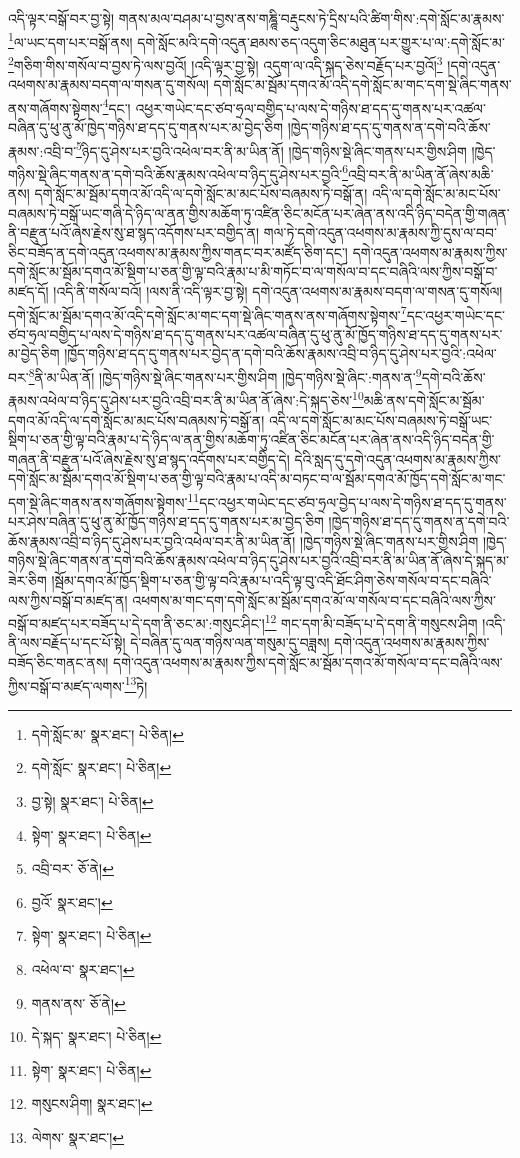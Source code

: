 འདི་ལྟར་བསྒོ་བར་བྱ་སྟེ། གནས་མལ་བཤམ་པ་བྱས་ནས་གཎྜཱི་བརྡུངས་ཏེ་དྲིས་པའི་ཚིག་གིས་:དགེ་སློང་མ་རྣམས་\footnote{དགེ་སློང་མ་  སྣར་ཐང་།  པེ་ཅིན། }ལ་ཡང་དག་པར་བསྒོ་ནས། དགེ་སློང་མའི་དགེ་འདུན་ཐམས་ཅད་འདུག་ཅིང་མཐུན་པར་གྱུར་པ་ལ་:དགེ་སློང་མ་\footnote{དགེ་སློང་  སྣར་ཐང་།  པེ་ཅིན། }གཅིག་གིས་གསོལ་བ་བྱས་ཏེ་ལས་བྱའོ། །འདི་ལྟར་བྱ་སྟེ། འདུག་ལ་འདི་སྐད་ཅེས་བརྗོད་པར་བྱའོ།\footnote{བྱ་སྟེ།  སྣར་ཐང་།  པེ་ཅིན། } །དགེ་འདུན་འཕགས་མ་རྣམས་བདག་ལ་གསན་དུ་གསོལ། དགེ་སློང་མ་སྦོམ་དགའ་མོ་འདི་དགེ་སློང་མ་གང་དག་སྡེ་ཞིང་གནས་ནས་གཞོགས་སྟེགས་\footnote{སྟེག་  སྣར་ཐང་།  པེ་ཅིན། }དང་། འཕྱར་གཡེང་དང་ཙབ་ཧྲལ་བགྱིད་པ་ལས་དེ་གཉིས་ཐ་དད་དུ་གནས་པར་འཚལ་བཞིན་དུ་ཕུ་ནུ་མོ་ཁྱེད་གཉིས་ཐ་དད་དུ་གནས་པར་མ་བྱེད་ཅིག །ཁྱེད་གཉིས་ཐ་དད་དུ་གནས་ན་དགེ་བའི་ཆོས་རྣམས་:འབྲི་བ་\footnote{འབྲི་བར་  ཅོ་ནེ། }ཉིད་དུ་ཤེས་པར་བྱའི་འཕེལ་བར་ནི་མ་ཡིན་ནོ། །ཁྱེད་གཉིས་སྡེ་ཞིང་གནས་པར་གྱིས་ཤིག །ཁྱེད་གཉིས་སྡེ་ཞིང་གནས་ན་དགེ་བའི་ཆོས་རྣམས་འཕེལ་བ་ཉིད་དུ་ཤེས་པར་བྱའི་\footnote{བྱའོ་  སྣར་ཐང་། }འབྲི་བར་ནི་མ་ཡིན་ནོ་ཞེས་མཆི་ནས། དགེ་སློང་མ་སྦོམ་དགའ་མོ་འདི་ལ་དགེ་སློང་མ་མང་པོས་བཞམས་ཏེ་བསྒོ་ན། འདི་ལ་དགེ་སློང་མ་མང་པོས་བཞམས་ཏེ་བསྒོ་ཡང་གཞི་དེ་ཉིད་ལ་ནན་གྱིས་མཆོག་ཏུ་འཛིན་ཅིང་མངོན་པར་ཞེན་ནས་འདི་ཉིད་བདེན་གྱི་གཞན་ནི་བརྫུན་པའོ་ཞེས་རྗེས་སུ་ཐ་སྙད་འདོགས་པར་བགྱིད་ན། གལ་ཏེ་དགེ་འདུན་འཕགས་མ་རྣམས་ཀྱི་དུས་ལ་བབ་ཅིང་བཟོད་ན་དགེ་འདུན་འཕགས་མ་རྣམས་ཀྱིས་གནང་བར་མཛོད་ཅིག་དང་། དགེ་འདུན་འཕགས་མ་རྣམས་ཀྱིས་དགེ་སློང་མ་སྦོམ་དགའ་མོ་སྡིག་པ་ཅན་གྱི་ལྟ་བའི་རྣམ་པ་མི་གཏོང་བ་ལ་གསོལ་བ་དང་བཞིའི་ལས་ཀྱིས་བསྒོ་བ་མཛད་དོ། །འདི་ནི་གསོལ་བའོ། །ལས་ནི་འདི་ལྟར་བྱ་སྟེ། དགེ་འདུན་འཕགས་མ་རྣམས་བདག་ལ་གསན་དུ་གསོལ། དགེ་སློང་མ་སྦོམ་དགའ་མོ་འདི་དགེ་སློང་མ་གང་དག་སྡེ་ཞིང་གནས་ནས་གཞོགས་སྟེགས་\footnote{སྟེག་  སྣར་ཐང་།  པེ་ཅིན། }དང་འཕྱར་གཡེང་དང་ཙབ་ཧྲལ་བགྱིད་པ་ལས་དེ་གཉིས་ཐ་དད་དུ་གནས་པར་འཚལ་བཞིན་དུ་ཕུ་ནུ་མོ་ཁྱོད་གཉིས་ཐ་དད་དུ་གནས་པར་མ་བྱེད་ཅིག །ཁྱོད་གཉིས་ཐ་དད་དུ་གནས་པར་བྱེད་ན་དགེ་བའི་ཆོས་རྣམས་འབྲི་བ་ཉིད་དུ་ཤེས་པར་བྱའི་:འཕེལ་བར་\footnote{འཕེལ་བ་  སྣར་ཐང་། }ནི་མ་ཡིན་ནོ། །ཁྱེད་གཉིས་སྡེ་ཞིང་གནས་པར་གྱིས་ཤིག །ཁྱེད་གཉིས་སྡེ་ཞིང་:གནས་ན་\footnote{གནས་ནས་  ཅོ་ནེ། }དགེ་བའི་ཆོས་རྣམས་འཕེལ་བ་ཉིད་དུ་ཤེས་པར་བྱའི་འབྲི་བར་ནི་མ་ཡིན་ནོ་ཞེས་:དེ་སྐད་ཅེས་\footnote{དེ་སྐད་  སྣར་ཐང་།  པེ་ཅིན། }མཆི་ནས་དགེ་སློང་མ་སྦོམ་དགའ་མོ་འདི་ལ་དགེ་སློང་མ་མང་པོས་བཞམས་ཏེ་བསྒོ་ན། འདི་ལ་དགེ་སློང་མ་མང་པོས་བཞམས་ཏེ་བསྒོ་ཡང་སྡིག་པ་ཅན་གྱི་ལྟ་བའི་རྣམ་པ་དེ་ཉིད་ལ་ནན་གྱིས་མཆོག་ཏུ་འཛིན་ཅིང་མངོན་པར་ཞེན་ནས་འདི་ཉིད་བདེན་གྱི་གཞན་ནི་བརྫུན་པའོ་ཞེས་རྗེས་སུ་ཐ་སྙད་འདོགས་པར་བགྱིད་དེ། དེའི་སླད་དུ་དགེ་འདུན་འཕགས་མ་རྣམས་ཀྱིས་དགེ་སློང་མ་སྦོམ་དགའ་མོ་སྡིག་པ་ཅན་གྱི་ལྟ་བའི་རྣམ་པ་འདི་མ་བཏང་བ་ལ་སྦོམ་དགའ་མོ་ཁྱོད་དགེ་སློང་མ་གང་དག་སྡེ་ཞིང་གནས་ནས་གཞོགས་སྟེགས་\footnote{སྟེག་  སྣར་ཐང་།  པེ་ཅིན། }དང་འཕྱར་གཡེང་དང་ཙབ་ཧྲལ་བྱེད་པ་ལས་དེ་གཉིས་ཐ་དད་དུ་གནས་པར་ཤེས་བཞིན་དུ་ཕུ་ནུ་མོ་ཁྱོད་གཉིས་ཐ་དད་དུ་གནས་པར་མ་བྱེད་ཅིག །ཁྱེད་གཉིས་ཐ་དད་དུ་གནས་ན་དགེ་བའི་ཆོས་རྣམས་འབྲི་བ་ཉིད་དུ་ཤེས་པར་བྱའི་འཕེལ་བར་ནི་མ་ཡིན་ནོ། །ཁྱེད་གཉིས་སྡེ་ཞིང་གནས་པར་གྱིས་ཤིག །ཁྱེད་གཉིས་སྡེ་ཞིང་གནས་ན་དགེ་བའི་ཆོས་རྣམས་འཕེལ་བ་ཉིད་དུ་ཤེས་པར་བྱའི་འབྲི་བར་ནི་མ་ཡིན་ནོ་ཞེས་དེ་སྐད་མ་ཟེར་ཅིག །སྦོམ་དགའ་མོ་ཁྱོད་སྡིག་པ་ཅན་གྱི་ལྟ་བའི་རྣམ་པ་འདི་ལྟ་བུ་འདི་ཐོང་ཤིག་ཅེས་གསོལ་བ་དང་བཞིའི་ལས་ཀྱིས་བསྒོ་བ་མཛད་ན། འཕགས་མ་གང་དག་དགེ་སློང་མ་སྦོམ་དགའ་མོ་ལ་གསོལ་བ་དང་བཞིའི་ལས་ཀྱིས་བསྒོ་བ་མཛད་པར་བཟོད་པ་དེ་དག་ནི་ཅང་མ་:གསུང་ཤིང་།\footnote{གསུངས་ཤིག།  སྣར་ཐང་། } གང་དག་མི་བཟོད་པ་དེ་དག་ནི་གསུངས་ཤིག །འདི་ནི་ལས་བརྗོད་པ་དང་པོ་སྟེ། དེ་བཞིན་དུ་ལན་གཉིས་ལན་གསུམ་དུ་བཟླས། དགེ་འདུན་འཕགས་མ་རྣམས་ཀྱིས་བཟོད་ཅིང་གནང་ནས། དགེ་འདུན་འཕགས་མ་རྣམས་ཀྱིས་དགེ་སློང་མ་སྦོམ་དགའ་མོ་གསོལ་བ་དང་བཞིའི་ལས་ཀྱིས་བསྒོ་བ་མཛད་ལགས་\footnote{ལེགས་  སྣར་ཐང་། }ཏེ། 